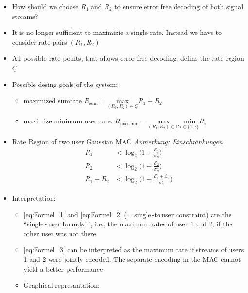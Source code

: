 \documentclass[a4paper, 10pt]{article}
\begin{document}
\begin{itemize}
	\item How should we choose $R_1 $ and $R_2 $ to ensure error free decoding of \underline{both} signal streams?
	\item It is no longer sufficient to maximizie a single rate. Instead we have to consider rate pairs $(R_1, R_2)$
	\item All possible rate points, that allows error free decoding, define the rate region $\underline{C} $
	\item Possible desing goals of the system:
	\begin{itemize}
		\item maximized sumrate $R_{\text{sum}} = \underset{(R_1, R_2) \in \underline{C}}{\text{max}} R_1 + R_2 $ 
		\item maximize minimum user rate: $R_{\text{max-min}} = \underset{(R_1, R_2) \in \underline{C}}{\text{max}} \, \underset{i \in \{1, 2\}}{\text{min}} R_i $ 
	\end{itemize}
	\item Rate Region of two user Gaussian MAC \quad\textit{Anmerkung: Einschr\"ankungen}
	\begin{align}
		R_1 &< \log_2\bigl(1 + \frac{\mathcal{E}_1}{\sigma_n^2}\bigr) \label{eq:Formel_1}\\ 
		R_2 &< \log_2\bigl(1 + \frac{\mathcal{E}_2}{\sigma_n^2}\bigr)\label{eq:Formel_2} \\ 
		R_1 + R_2 &< \log_2\bigl(1 + \frac{\mathcal{E}_1 + \mathcal{E}_2}{\sigma_n^2}\bigr) 	\label{eq:Formel_3}	
	\end{align}
	\item Interpretation:
	\begin{itemize}
		\item \eqref{eq:Formel_1} and \eqref{eq:Formel_2}  (= single\,-to\,user constraint) are the ``single\,-\,user bounds´´, i.e., the maximum rates of user 1 and 2, if the other user was not there
		\item \eqref{eq:Formel_3} can be interpreted as the maximum rate if streams of users 1 and 2 were jointly encoded. The separate encoding in the MAC cannot yield a better performance
		\item Graphical represantation: \\
\end{itemize}
\end{itemize}
\end{document}
